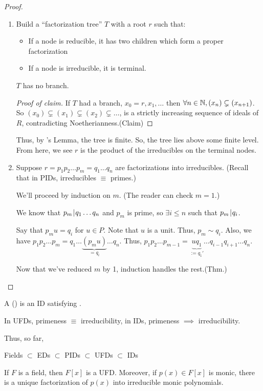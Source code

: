 \documentclass[notes.tex]{subfiles}
\begin{document}
\begin{proof}\leavevmode
	\begin{enumerate}
	\item 
		Build a ``factorization tree'' $T$ with a root $r$ such that:
		\begin{itemize}
			\item If a node is reducible, it has two children which form a proper factorization
			\item If a node is irreducible, it is terminal.
		\end{itemize}
		\begin{claim}
			$T$ has no branch.
		\end{claim}
		\begin{proof}[Proof of claim]
			If $T$ had a branch, $x_0=r,x_1, \ldots$ then $\forall n\in \mathbb{N}, (x_n) \subsetneq (x_{n+1})$. So $(x_0) \subsetneq (x_1)\subsetneq (x_2)\subsetneq \ldots$, is a strictly increasing sequence of ideals of $R$, contradicting Noetherianness.\qedhere(Claim)
		\end{proof}
		Thus, by 's Lemma, the tree is finite. So, the tree lies above some finite level. From here, we see $r$ is the product of the irreducibles on the terminal nodes.
	\item 
		Suppose $r=p_1p_2\ldots p_m = q_1\ldots q_n$ are factorizations into irreducibles. (Recall that in PIDs, irreducibles $\equiv$ primes.)

		We'll proceed by induction on $m$. 
		(The reader can check $m=1$.)

		We know that $p_m \mkern2mu|\mkern1mu q_1\ldots q_n$ and $p_m$ is prime, so $\exists i\le n$ such that $p_m\mkern2mu|\mkern1mu q_i$.

		Say that $p_mu = q_i$ for $u\in P$. Note that $u$ is a unit. Thus, $p_m\sim q_i$. Also, we have $p_1p_2\ldots p_m = q_1\ldots \underbrace{(p_mu)}_{=q_i}\ldots q_n$.
		Thus, $p_1p_2\ldots p_{m-1} = \underbrace{uq_1}_{:=q_1'}\ldots q_{i-1}q_{i+1}\ldots q_n$.

		Now that we've reduced $m$ by 1, induction handles the rest.\qedhere(Thm.)
	\end{enumerate}
\end{proof}

\begin{defn}
	A  () is an ID satisfying .
\end{defn}

\begin{remark}
	In UFDs, primeness $\equiv$ irreducibility, in IDs, primeness $\implies$ irreducibility.

	Thus, so far,
	\begin{center}
		Fields $\subset$ EDs $\subset$ PIDs $\subset$ UFDs $\subset$ IDs
	\end{center}
\end{remark}

\begin{corollary}
	If $F$ is a field, then $F[x]$ is a UFD. Moreover, if $p(x)\in F[x]$ is monic, there is a unique factorization of $p(x)$ into irreducible monic polynomials.
\end{corollary}
\end{document}
